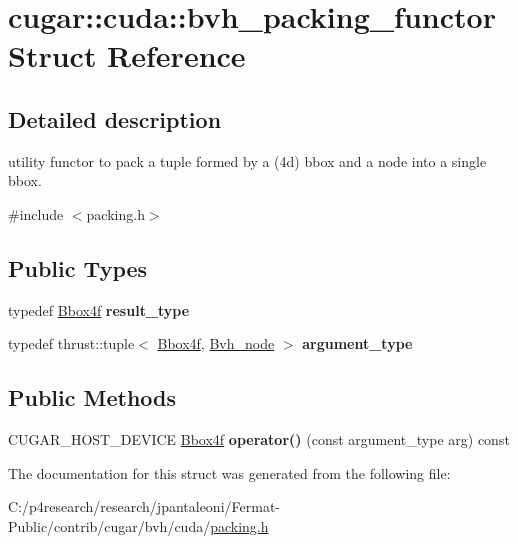 \hypertarget{structcugar_1_1cuda_1_1bvh__packing__functor}{}\section{cugar\+:\+:cuda\+:\+:bvh\+\_\+packing\+\_\+functor Struct Reference}
\label{structcugar_1_1cuda_1_1bvh__packing__functor}


\subsection{Detailed description}
utility functor to pack a tuple formed by a (4d) bbox and a node into a single bbox. 

{\ttfamily \#include $<$packing.\+h$>$}

\subsection*{Public Types}
\begin{DoxyCompactItemize}
\item 
\mbox{\label{structcugar_1_1cuda_1_1bvh__packing__functor_a9a5ac7e10774cb4898e3abec32e330a4}} 
typedef \hyperlink{structcugar_1_1_bbox}{Bbox4f} {\bfseries result\+\_\+type}
\item 
\mbox{\label{structcugar_1_1cuda_1_1bvh__packing__functor_a6b94ea9009dffb1233c2cdf74bb9875a}} 
typedef thrust\+::tuple$<$ \hyperlink{structcugar_1_1_bbox}{Bbox4f}, \hyperlink{structcugar_1_1_bvh__node}{Bvh\+\_\+node} $>$ {\bfseries argument\+\_\+type}
\end{DoxyCompactItemize}
\subsection*{Public Methods}
\begin{DoxyCompactItemize}
\item 
\mbox{\label{structcugar_1_1cuda_1_1bvh__packing__functor_a692a1787c99cfc435e1d525a1533c967}} 
C\+U\+G\+A\+R\+\_\+\+H\+O\+S\+T\+\_\+\+D\+E\+V\+I\+CE \hyperlink{structcugar_1_1_bbox}{Bbox4f} {\bfseries operator()} (const argument\+\_\+type arg) const
\end{DoxyCompactItemize}


The documentation for this struct was generated from the following file\+:\begin{DoxyCompactItemize}
\item 
C\+:/p4research/research/jpantaleoni/\+Fermat-\/\+Public/contrib/cugar/bvh/cuda/\hyperlink{packing_8h}{packing.\+h}\end{DoxyCompactItemize}
